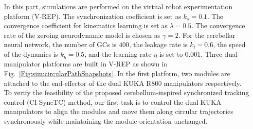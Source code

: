\documentclass[journal,twoside,web]{ieeecolor}
\begin{document}
In this part, simulations are performed on the virtual robot experimentation platform (V-REP). The synchronization coefficient is set as $k_s= 0.1$. The convergence coefficient for kinematics learning is set as $\lambda = 0.5$. The convergence rate of the zeroing neurodynamic model is chosen as $\gamma = 2$. For the cerebellar neural network, the number of GCs is $400$, the leakage rate is $k_l = 0.6$, the speed of the dynamics is $k_g = 0.5$, and the learning rate $\eta$ is set to $0.001$. Three dual-manipulator platforms are built in V-REP as shown in Fig.~\ref{Fig:sim:circularPathSnapshots}. In the first platform, two modules are attached to the end-effector of the dual KUKA R800 manipulators respectively. To verify the feasibility of the proposed cerebellum-inspired synchronized tracking control (CI-SyncTC) method, our first task is to control the dual KUKA manipulators to align the modules and move them along circular trajectories synchronously while maintaining the module orientation unchanged.
\end{document}
